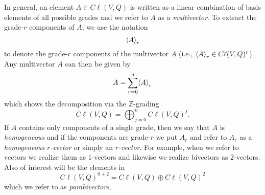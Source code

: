 In general, an element $A \in C\ell(V,Q)$ is written as a linear combination of basis elements of all possible grades and we refer to $A$ as a \emph{multivector}.  To extract the grade-$r$ components of $A$, we use the notation
\begin{equation}
\proj{r}{A}
\end{equation}
to denote the grade-$r$ components of the multivector $A$ (i.e., $\proj{r}{A} \in C\ell(V,Q)^r$). Any multivector $A$ can then be given by
\begin{equation}
A = \sum_{r=0}^n \proj{r}{A}
\end{equation}
which shows the decomposition via the $\mathbb{Z}$-grading
\begin{equation}
C\ell(V,Q) = \bigoplus_{j=0}^n C\ell(V,Q)^j.
\end{equation}
If $A$ contains only components of a single grade, then we say that $A$ is \emph{homogeneous} and if the components are grade-$r$ we put $A_r$ and refer to $A_r$ as a \emph{homogeneous $r$-vector} or simply an \emph{$r$-vector}.  For example, when we refer to vectors we realize them as 1-vectors and likewise we realize bivectors as 2-vectors. Also of interest will be the elements in
\begin{equation}
 C\ell(V,Q)^{0+2} = C\ell(V,Q)\oplus C\ell(V,Q)^2
\end{equation}
which we refer to as \emph{parabivectors}.

